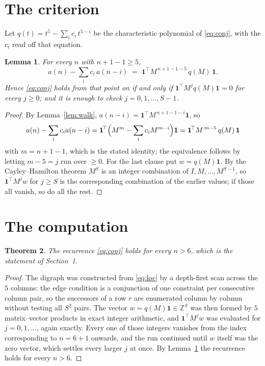 \documentclass[11pt,a4paper]{article}
\theoremstyle{plain}
\newtheorem{theorem}{Theorem}
\newtheorem{lemma}[theorem]{Lemma}
\theoremstyle{definition}
\begin{document}
\section{The criterion}

Let $q(t)=t^{5}-\sum_i c_i\,t^{5-i}$ be the characteristic polynomial of
\eqref{eq:conj}, with the $c_i$ read off that equation.

\begin{lemma}\label{lem:crit}
For every $n$ with $n+1-1\ge5$,
\[
a(n)-\sum_i c_i\,a(n-i)\;=\;\mathbf{1}^{\!\top}M^{\,n+1-1-5}\,q(M)\,\mathbf{1} .
\]
Hence \eqref{eq:conj} holds from that point on if and only if
$\mathbf{1}^{\!\top}M^{j}q(M)\mathbf{1}=0$ for every $j\ge0$; and it is enough to check
$j=0,1,\dots,S-1$.
\end{lemma}

\begin{proof}
By Lemma~\ref{lem:walk}, $a(n-i)=\mathbf{1}^{\!\top}M^{\,n+1-1-i}\mathbf{1}$, so
\[
a(n)-\sum_i c_i a(n-i)
=\mathbf{1}^{\!\top}\Bigl(M^{m}-\sum_i c_i M^{m-i}\Bigr)\mathbf{1}
=\mathbf{1}^{\!\top}M^{\,m-5}\,q(M)\,\mathbf{1}
\]
with $m=n+1-1$, which is the stated identity; the equivalence follows by letting
$m-5=j$ run over $\ge0$. For the last clause put $w=q(M)\mathbf{1}$. By the
Cayley--Hamilton theorem $M^{S}$ is an integer combination of $I,M,\dots,M^{S-1}$, so
$\mathbf{1}^{\!\top}M^{j}w$ for $j\ge S$ is the corresponding combination of the earlier
values; if those all vanish, so do all the rest.
\end{proof}

\section{The computation}

\begin{theorem}
The recurrence \eqref{eq:conj} holds for every $n>6$, which is the statement of
Section~1.
\end{theorem}

\begin{proof}
The digraph was constructed from \eqref{eq:loc} by a depth-first scan across the $5$
columns: the edge condition is a conjunction of one constraint per consecutive column
pair, so the successors of a row $r$ are enumerated column by column without testing all
$S^2$ pairs. The vector $w=q(M)\mathbf{1}\in\mathbb{Z}^{S}$ was then formed by $5$
matrix--vector products in exact integer arithmetic, and $\mathbf{1}^{\!\top}M^{j}w$ was
evaluated for $j=0,1,\dots$, again exactly. Every one of those integers vanishes from the
index corresponding to $n=6+1$ onwards, and the run continued until $w$ itself was the
zero vector, which settles every larger $j$ at once. By Lemma~\ref{lem:crit} the recurrence
holds for every $n>6$.
\end{proof}
\end{document}
